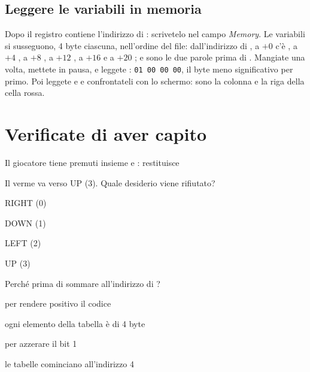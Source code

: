 \subsection{Leggere le variabili in memoria}

Dopo  il registro  contiene l'indirizzo di
: scrivetelo nel campo \emph{Memory}. Le variabili si susseguono, 4
byte ciascuna, nell'ordine del file: dall'indirizzo di , a $+0$ c'è
, a $+4$ , a $+8$ , a $+12$ , a
$+16$  e a $+20$ ;  e 
sono le due parole prima di . Mangiate una volta, mettete in pausa, e
leggete : \texttt{01 00 00 00}, il byte meno significativo per
primo. Poi leggete  e  e confrontateli con lo
schermo: sono la colonna e la riga della cella rossa.



\section{Verificate di aver capito}

\begin{quiz}{Il giocatore tiene premuti insieme  e :  restituisce}
\item {}
\item {}
\item {}
\item {}
\end{quiz}

\begin{quiz}{Il verme va verso UP (3). Quale desiderio viene rifiutato?}
\item RIGHT (0)
\item DOWN (1)
\item LEFT (2)
\item UP (3)
\end{quiz}

\begin{quiz}{Perché  prima di sommare all'indirizzo di ?}
\item per rendere positivo il codice
\item ogni elemento della tabella è di 4 byte
\item per azzerare il bit 1
\item le tabelle cominciano all'indirizzo 4
\end{quiz}

